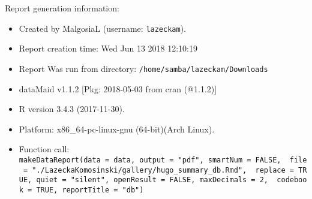 \documentclass[]{article}
\begin{document}
\noindent\makebox[\linewidth]{\rule{\textwidth}{0.4pt}}

Report generation information:

\begin{itemize}
\item
  Created by MalgosiaL (username: \texttt{lazeckam}).
\item
  Report creation time: Wed Jun 13 2018 12:10:19
\item
  Report Was run from directory: \texttt{/home/samba/lazeckam/Downloads}
\item
  dataMaid v1.1.2 {[}Pkg: 2018-05-03 from cran (@1.1.2){]}
\item
  R version 3.4.3 (2017-11-30).
\item
  Platform: x86\_64-pc-linux-gnu (64-bit)(Arch Linux).
\item
  Function call:
  \texttt{makeDataReport(data\ =\ data,\ output\ =\ "pdf",\ smartNum\ =\ FALSE,\ \ file\ =\ "./LazeckaKomosinski/gallery/hugo\_summary\_db.Rmd",\ \ replace\ =\ TRUE,\ quiet\ =\ "silent",\ openResult\ =\ FALSE,\ maxDecimals\ =\ 2,\ \ codebook\ =\ TRUE,\ reportTitle\ =\ "db")}
\end{itemize}
\end{document}
